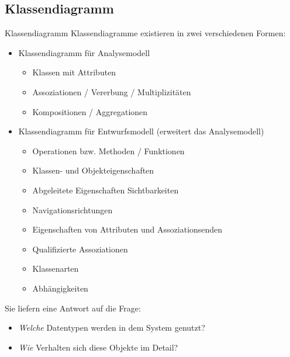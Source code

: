 \subsection{Klassendiagramm}

\begin{defi}{Klassendiagramm}
    Klassendiagramme existieren in zwei verschiedenen Formen:

    \begin{itemize}
        \item Klassendiagramm für Analysemodell
              \begin{itemize}
                  \item Klassen mit Attributen
                  \item Assoziationen / Vererbung / Multiplizitäten
                  \item Kompositionen / Aggregationen
              \end{itemize}
        \item Klassendiagramm für Entwurfsmodell (erweitert das Analysemodell)
              \begin{itemize}
                  \item Operationen bzw. Methoden / Funktionen
                  \item Klassen- und Objekteigenschaften
                  \item Abgeleitete Eigenschaften Sichtbarkeiten
                  \item Navigationsrichtungen
                  \item Eigenschaften von Attributen und Assoziationsenden
                  \item Qualifizierte Assoziationen
                  \item Klassenarten
                  \item Abhängigkeiten
              \end{itemize}
    \end{itemize}

    Sie liefern eine Antwort auf die Frage:
    \begin{itemize}
        \item \emph{Welche} Datentypen werden in dem System genutzt?
        \item \emph{Wie} Verhalten sich diese Objekte im Detail?
    \end{itemize}
\end{defi}


